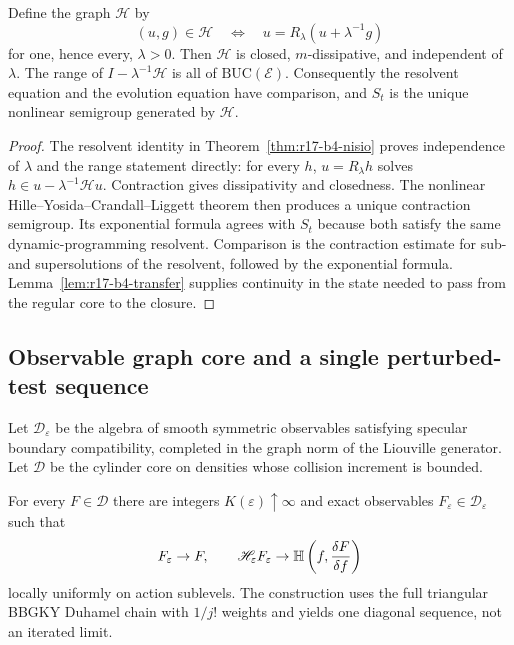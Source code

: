 \begin{theorem}
\label{thm:r17-b4-comparison}
Define the graph $\mathcal H$ by
\[
 (u,g)\in\mathcal H
 \quad\Longleftrightarrow\quad
 u=R_\lambda(u+\lambda^{-1}g)
\]
for one, hence every, $\lambda>0$.  Then $\mathcal H$ is closed,
$m$-dissipative, and independent of $\lambda$.  The range of
$I-\lambda^{-1}\mathcal H$ is all of
$\mathrm{BUC}(\mathcal E)$.  Consequently the resolvent equation and the
evolution equation have comparison, and $S_t$ is the unique nonlinear
semigroup generated by $\mathcal H$.
\end{theorem}

\begin{proof}
The resolvent identity in Theorem~\ref{thm:r17-b4-nisio} proves independence
of $\lambda$ and the range statement directly: for every $h$, $u=R_\lambda h$
solves $h\in u-\lambda^{-1}\mathcal H u$.  Contraction gives dissipativity
and closedness.  The nonlinear Hille--Yosida--Crandall--Liggett theorem then
produces a unique contraction semigroup.  Its exponential formula agrees with
$S_t$ because both satisfy the same dynamic-programming resolvent.  Comparison
is the contraction estimate for sub- and supersolutions of the resolvent,
followed by the exponential formula.  Lemma~\ref{lem:r17-b4-transfer} supplies
continuity in the state needed to pass from the regular core to the closure.
\end{proof}

\subsection{Observable graph core and a single perturbed-test sequence}

Let $\mathscr D_\varepsilon$ be the algebra of smooth symmetric observables
satisfying specular boundary compatibility, completed in the graph norm of the
Liouville generator.  Let $\mathscr D$ be the cylinder core on densities whose
collision increment is bounded.

\begin{theorem}
\label{thm:r17-b4-corrector}
For every $F\in\mathscr D$ there are integers $K(\varepsilon)\uparrow\infty$
and exact observables $F_\varepsilon\in\mathscr D_\varepsilon$ such that
\[
 F_\varepsilon\to F,
 \qquad
 \mathscr H_\varepsilon F_\varepsilon
 \to\mathbb H\left(f,{\delta F\over\delta f}\right)
\]
locally uniformly on action sublevels.  The construction uses the full
triangular BBGKY Duhamel chain with $1/j!$ weights and yields one diagonal
sequence, not an iterated limit.
\end{theorem}

